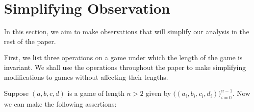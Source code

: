 \documentclass[12pt]{amsart}
\newtheorem{definition}[theorem]{Definition}
\newcommand{\breathe}{\vspace{0.2cm}}
\newcommand{\znn}{\mathbb{N}}
\begin{document}
%
%
%
%
%

\section{Simplifying Observation\label{sec:invariants}}

In this section, we aim to make observations that will simplify our analysis in the rest of the paper.

First, we list three operations on a game under which the length of the game is invariant. We shall use the operations throughout the paper to make simplifying modifications to games without affecting their lengths.

Suppose $(a,b,c,d)$ is a game of length $n > 2$ given by $\Big((a_i, b_i, c_i, d_i)\Big)_{i=0}^{n - 1}$. Now we can make the following assertions:
\end{document}
